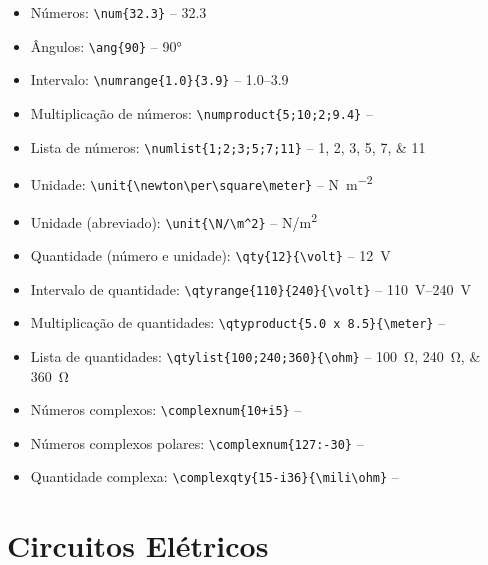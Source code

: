     \begin{itemize}
        \item Números: \lstinline[language=teX,style=code]|\num{32.3}| -- \num{32.3}
        \item Ângulos: \lstinline[language=teX,style=code]|\ang{90}| -- \ang{90}
        \item Intervalo: \lstinline[language=teX,style=code]|\numrange{1.0}{3.9}| -- \numrange{1.0}{3.9}
        \item Multiplicação de números: \lstinline[language=teX,style=code]|\numproduct{5;10;2;9.4}| -- 
        \item Lista de números: \lstinline[language=teX,style=code]|\numlist{1;2;3;5;7;11}| -- \numlist{1;2;3;5;7;11}
        \item Unidade: \lstinline[language=teX,style=code]|\unit{\newton\per\square\meter}| -- \unit{\newton\per\square\meter}
        \item Unidade (abreviado): \lstinline[language=teX,style=code]|\unit{\N/\m^2}| -- \unit{\N/\m^2}
        \item Quantidade (número e unidade): \lstinline[language=teX,style=code]|\qty{12}{\volt}| -- \qty{12}{\volt}
        \item Intervalo de quantidade: \lstinline[language=teX,style=code]|\qtyrange{110}{240}{\volt}| -- \qtyrange{110}{240}{\volt}
        \item Multiplicação de quantidades: \lstinline[language=teX,style=code]|\qtyproduct{5.0 x 8.5}{\meter}| -- 
        \item Lista de quantidades: \lstinline[language=teX,style=code]|\qtylist{100;240;360}{\ohm}| -- \qtylist{100;240;360}{\ohm}
        \item Números complexos: \lstinline[language=teX,style=code]|\complexnum{10+i5}| -- 
        \item Números complexos polares: \lstinline[language=teX,style=code]|\complexnum{127:-30}| -- 
        \item Quantidade complexa: \lstinline[language=teX,style=code]|\complexqty{15-i36}{\mili\ohm}| -- 
    \end{itemize}


\section{Circuitos Elétricos}
\label{sec:circuitos}

